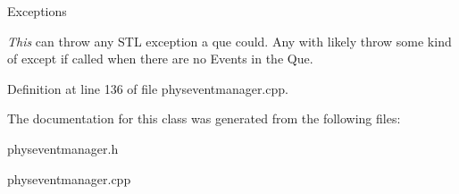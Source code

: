 \begin{DoxyExceptions}{Exceptions}
\item[{\em This}]can throw any STL exception a que could. Any with likely throw some kind of except if called when there are no Events in the Que. \end{DoxyExceptions}


Definition at line 136 of file physeventmanager.cpp.

The documentation for this class was generated from the following files:\begin{DoxyCompactItemize}
\item 
physeventmanager.h\item 
physeventmanager.cpp\end{DoxyCompactItemize}
